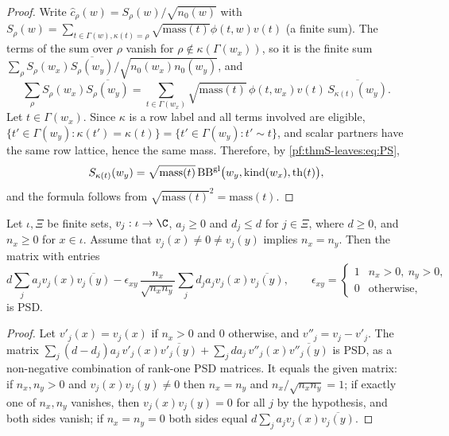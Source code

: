 \begin{proof}
Write $\hat c_\rho(w)=S_\rho(w)/\sqrt{n_0(w)}$ with $S_\rho(w)=\sum_{t\in\Gamma(w),\kappa(t)=\rho}\sqrt{\mathrm{mass}(t)}\phi(t,w)v(t)$
(a finite sum). The terms of the sum over $\rho$ vanish for $\rho\notin\kappa(\Gamma(w_x))$, so it is the finite sum
$\sum_\rho S_\rho(w_x)\overline{S_\rho(w_y)}/\sqrt{n_0(w_x)n_0(w_y)}$, and
\[
\sum_\rho S_\rho(w_x)\overline{S_\rho(w_y)}=\sum_{t\in\Gamma(w_x)}\sqrt{\mathrm{mass}(t)}\,\phi(t,w_x)v(t)\,\overline{S_{\kappa(t)}(w_y)}.
\]
Let $t\in\Gamma(w_x)$. Since $\kappa$ is a row label and all terms involved are eligible,
$\{t'\in\Gamma(w_y):\kappa(t')=\kappa(t)\}=\{t'\in\Gamma(w_y):t'\sim t\}$, and scalar partners have the same row lattice,
hence the same mass. Therefore, by \eqref{pf:thmS-leaves:eq:PS},
\[
S_{\kappa(t)}(w_y)=\sqrt{\mathrm{mass}(t)}\,\mathrm{BB}^{\mathrm{gl}}\bigl(w_y,\mathrm{kind}(w_x),\mathrm{th}(t)\bigr),
\]
and the formula follows from $\sqrt{\mathrm{mass}(t)}^2=\mathrm{mass}(t)$.
\end{proof}

\begin{lemma}\label{pf:thmS-leaves:lem:gram}
Let $\iota,\Xi$ be finite sets, $v_j:\iota\to\C$, $a_j\ge0$ and $d_j\le d$ for $j\in\Xi$, where $d\ge0$, and $n_x\ge0$
for $x\in\iota$. Assume that $v_j(x)\ne0\ne v_j(y)$ implies $n_x=n_y$. Then the matrix with entries
\[
d\sum_ja_jv_j(x)\overline{v_j(y)}-\epsilon_{xy}\,\frac{n_x}{\sqrt{n_xn_y}}\sum_jd_ja_jv_j(x)\overline{v_j(y)},\qquad
\epsilon_{xy}=\begin{cases}1&n_x>0,\ n_y>0,\\0&\text{otherwise,}\end{cases}
\]
is PSD.
\end{lemma}

\begin{proof}
Let $v'_j(x)=v_j(x)$ if $n_x>0$ and $0$ otherwise, and $v''_j=v_j-v'_j$. The matrix
$\sum_j(d-d_j)a_j\,v'_j(x)\overline{v'_j(y)}+\sum_jda_j\,v''_j(x)\overline{v''_j(y)}$ is PSD, as a non-negative combination of
rank-one PSD matrices. It equals the given matrix: if $n_x,n_y>0$ and $v_j(x)v_j(y)\ne0$ then $n_x=n_y$ and
$n_x/\sqrt{n_xn_y}=1$; if exactly one of $n_x,n_y$ vanishes, then $v_j(x)v_j(y)=0$ for all $j$ by the hypothesis, and both
sides vanish; if $n_x=n_y=0$ both sides equal $d\sum_ja_jv_j(x)\overline{v_j(y)}$.
\end{proof}

